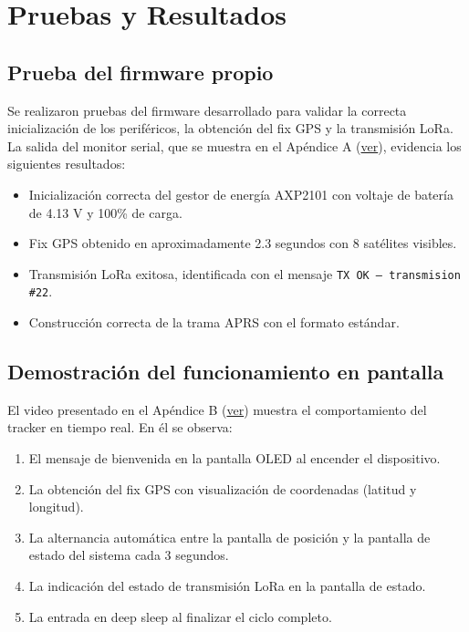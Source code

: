 \documentclass[conference]{IEEEtran}
\begin{document}
\section{Pruebas y Resultados}

\subsection{Prueba del firmware propio}

Se realizaron pruebas del firmware desarrollado para validar la correcta inicialización de los periféricos, la obtención del fix GPS y la transmisión LoRa. La salida del monitor serial, que se muestra en el Apéndice A (\hyperlink{apendice:serial}{ver}), evidencia los siguientes resultados:

\begin{itemize}
    \item Inicialización correcta del gestor de energía AXP2101 con voltaje de batería de 4.13 V y 100\% de carga.
    \item Fix GPS obtenido en aproximadamente 2.3 segundos con 8 satélites visibles.
    \item Transmisión LoRa exitosa, identificada con el mensaje \texttt{TX OK — transmision \#22}.
    \item Construcción correcta de la trama APRS con el formato estándar.
\end{itemize}

\subsection{Demostración del funcionamiento en pantalla}

El video presentado en el Apéndice B (\hyperlink{apendice:video}{ver}) muestra el comportamiento del tracker en tiempo real. En él se observa:

\begin{enumerate}
    \item El mensaje de bienvenida en la pantalla OLED al encender el dispositivo.
    \item La obtención del fix GPS con visualización de coordenadas (latitud y longitud).
    \item La alternancia automática entre la pantalla de posición y la pantalla de estado del sistema cada 3 segundos.
    \item La indicación del estado de transmisión LoRa en la pantalla de estado.
    \item La entrada en deep sleep al finalizar el ciclo completo.
\end{enumerate}
\end{document}

